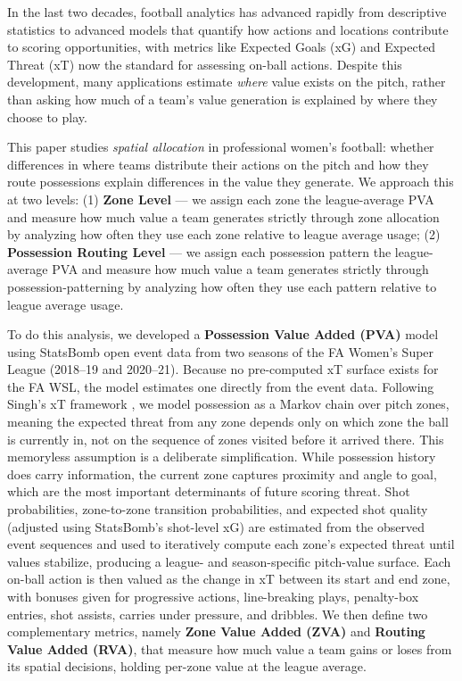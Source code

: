 \documentclass[12pt,a4paper]{article}
\begin{document}
In the last two decades, football analytics has advanced rapidly from descriptive statistics to advanced models that quantify how actions and locations contribute to scoring opportunities, with metrics like Expected Goals (xG) and Expected Threat (xT) now the standard for assessing on-ball actions. Despite this development, many applications estimate \emph{where} value exists on the pitch, rather than asking how much of a team's value generation is explained by where they choose to play.

This paper studies \textit{spatial allocation} in professional women's football: whether differences in where teams distribute their actions on the pitch and how they route possessions explain differences in the value they generate. We approach this at two levels: (1) \textbf{Zone Level} --- we assign each zone the league-average PVA and measure how much value a team generates strictly through zone allocation by analyzing how often they use each zone relative to league average usage; (2) \textbf{Possession Routing Level} --- we assign each possession pattern the league-average PVA and measure how much value a team generates strictly through possession-patterning by analyzing how often they use each pattern relative to league average usage.

To do this analysis, we developed a \textbf{Possession Value Added (PVA)} model using StatsBomb open event data from two seasons of the FA Women's Super League (2018--19 and 2020--21). Because no pre-computed xT surface exists for the FA WSL, the model estimates one directly from the event data. Following Singh's xT framework \cite{singh_xt_2018}, we model possession as a Markov chain over pitch zones, meaning the expected threat from any zone depends only on which zone the ball is currently in, not on the sequence of zones visited before it arrived there. This memoryless assumption is a deliberate simplification. While possession history does carry information, the current zone captures proximity and angle to goal, which are the most important determinants of future scoring threat. Shot probabilities, zone-to-zone transition probabilities, and expected shot quality (adjusted using StatsBomb's shot-level xG) are estimated from the observed event sequences and used to iteratively compute each zone's expected threat until values stabilize, producing a league- and season-specific pitch-value surface. Each on-ball action is then valued as the change in xT between its start and end zone, with bonuses given for progressive actions, line-breaking plays, penalty-box entries, shot assists, carries under pressure, and dribbles. We then define two complementary metrics, namely \textbf{Zone Value Added (ZVA)} and \textbf{Routing Value Added (RVA)}, that measure how much value a team gains or loses from its spatial decisions, holding per-zone value at the league average.
\end{document}
